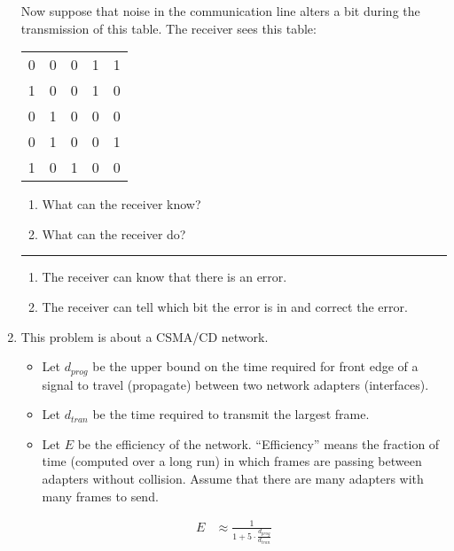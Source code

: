 \documentclass[twoside]{article}
\newenvironment{answer}
  {\vspace*{0.2cm} \rule{12cm}{0.04cm} \vspace*{0.2cm}}
  {\vspace*{0.2cm}}
\begin{document}
\begin{enumerate}
    Now suppose that noise in the communication line
    alters a bit during the transmission of this table.
    The receiver sees this table:

  \begin{tabular}{llll|l}
    0 & 0 & 0 & 1 & 1 \\
    1 & 0 & 0 & 1 & 0 \\
    0 & 1 & 0 & 0 & 0 \\
    0 & 1 & 0 & 0 & 1 \\ \hline
    1 & 0 & 1 & 0 & 0
    \end{tabular}

    \begin{enumerate}
      \item What can the receiver know?
      \item What can the receiver do?
      \end{enumerate}

  \begin{answer}

  \begin{enumerate}
    \item The receiver can know that there is an error.
    \item The receiver can tell which bit the error is in and correct the error.
    \end{enumerate}

    \end{answer}

  \item This problem is about a CSMA/CD network.
  \begin{itemize}
    \item Let $d_{prog}$ be the upper bound on the time required
      for front edge of a signal to travel (propagate) between two network adapters (interfaces).
    \item Let $d_{tran}$ be the time required to transmit the largest frame.
    \item Let $E$ be the efficiency of the network. ``Efficiency'' means the
      fraction of time (computed over a long run) in which frames are passing
      between adapters without collision. Assume that there are many adapters
      with many frames to send.
    \end{itemize}

  \begin{align*}
    E & \approx \frac{1}{1 + 5 \cdot \frac{d_{prog}}{d_{tran}}}
    \end{align*}


\end{enumerate}
\end{document}
